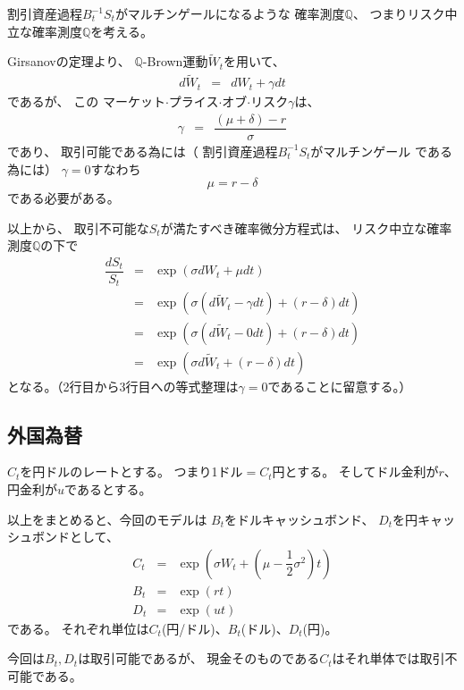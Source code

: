 \documentclass[uplatex,a4j,12pt,dvipdfmx]{jsarticle}
\begin{document}
割引資産過程$B^{-1}_{t} S_{t}$がマルチンゲールになるような
確率測度$\mathbb{Q}$、
つまりリスク中立な確率測度$\mathbb{Q}$を考える。

Girsanovの定理より、
$\mathbb{Q}$-Brown運動$\tilde{W}_{t}$を用いて、
%
%
\begin{eqnarray*}
	d \tilde{W}_{t}
	&=&
	d W_{t} + \gamma dt
\end{eqnarray*}
%
%
であるが、
この
マーケット$\cdot$プライス$\cdot$オブ$\cdot$リスク$\gamma$は、
%
%
\begin{eqnarray*}
	\gamma
	&=&
	\dfrac{(\mu + \delta) - r}{\sigma}
\end{eqnarray*}
%
%
であり、
取引可能である為には（
割引資産過程$B^{-1}_{t} S_{t}$がマルチンゲール
である為には）
$\gamma=0$すなわち
$$
	\mu = r - \delta
$$
である必要がある。

以上から、
取引不可能な$S_{t}$が満たすべき確率微分方程式は、
リスク中立な確率測度$\mathbb{Q}$の下で
%
%
\begin{eqnarray*}
	\dfrac{dS_{t}}{S_{t}}
	&=&
	\exp \left( \sigma dW_{t} + \mu dt \right)
	\\ &=&
	\exp \left( \sigma ( d \tilde{W}_{t} - \gamma dt ) + (r - \delta) dt \right)
	\\ &=&
	\exp \left( \sigma ( d \tilde{W}_{t} - 0 dt ) + (r - \delta) dt \right)
	\\ &=&
	\exp \left( \sigma d \tilde{W}_{t} + (r - \delta) dt \right)
\end{eqnarray*}
%
%
となる。（2行目から3行目への等式整理は$\gamma=0$であることに留意する。）

\subsection*{外国為替}

$C_{t}$を円ドルのレートとする。
つまり1ドル$=C_{t}$円とする。
そしてドル金利が$r$、
円金利が$u$であるとする。

以上をまとめると、今回のモデルは
$B_{t}$をドルキャッシュボンド、
$D_{t}$を円キャッシュボンドとして、
%
%
\begin{eqnarray*}
	C_{t}
	&=&
	\exp \left( \sigma W_{t} + \left( \mu - \dfrac{1}{2} \sigma^{2} \right) t \right)
	\\
	B_{t}
	&=&
	\exp (rt)
	\\
	D_{t}
	&=&
	\exp (ut)
\end{eqnarray*}
%
%
である。
それぞれ単位は$C_{t}$(円/ドル)、$B_{t}$(ドル)、$D_{t}$(円)。

今回は$B_{t},D_{t}$は取引可能であるが、
現金そのものである$C_{t}$はそれ単体では取引不可能である。
\end{document}
